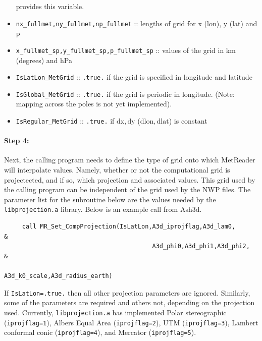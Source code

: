 \documentclass[11pt]{article}   %
\begin{document}
\begin{itemize}
provides this variable.
\item \texttt{nx\_fullmet,ny\_fullmet,np\_fullmet} :: lengths of grid for x (lon), y (lat) and p
\item \texttt{x\_fullmet\_sp,y\_fullmet\_sp,p\_fullmet\_sp} :: values of the grid in km (degrees) and hPa
\item \texttt{IsLatLon\_MetGrid} :: \texttt{.true.} if the grid is specified in longitude and latitude
\item \texttt{IsGlobal\_MetGrid} :: \texttt{.true.} if the grid is periodic in longitude.  (Note:
mapping across the poles is not yet implemented).
\item \texttt{IsRegular\_MetGrid} :: \texttt{.true.} if $\mathrm{dx,dy}$ ($\mathrm{dlon,dlat}$) is constant
\end{itemize}

\paragraph{Step 4:} Next, the calling program needs to define the type of grid onto which MetReader 
will interpolate values.  Namely, whether or not the computational grid is projectected, and if so,
which projection and associated values.  This grid used by the calling program can be independent
of the grid used by the NWP files.  The parameter list for the subroutine below are the values
needed by the \texttt{libprojection.a} library.  Below is an example call from Ash3d.
\begin{verbatim}
     call MR_Set_CompProjection(IsLatLon,A3d_iprojflag,A3d_lam0,           &
                                         A3d_phi0,A3d_phi1,A3d_phi2,       &
                                         A3d_k0_scale,A3d_radius_earth)
\end{verbatim}
If \texttt{IsLatLon=.true.} then all other projection parameters are ignored.  Similarly,
some of the parameters are required and others not, depending on the projection used.
Currently, \texttt{libprojection.a} has implemented
Polar stereographic (\texttt{iprojflag=1}),
Albers Equal Area (\texttt{iprojflag=2}),
UTM (\texttt{iprojflag=3}),
Lambert conformal conic (\texttt{iprojflag=4}),
and Mercator (\texttt{iprojflag=5}).
\end{document}
